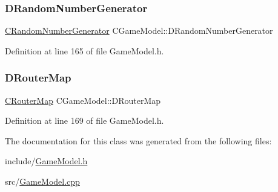 \subsubsection{\texorpdfstring{D\+Random\+Number\+Generator}{DRandomNumberGenerator}}
{\footnotesize\ttfamily \hyperlink{classCRandomNumberGenerator}{C\+Random\+Number\+Generator} C\+Game\+Model\+::\+D\+Random\+Number\+Generator\hspace{0.3cm}{\ttfamily [protected]}}



Definition at line 165 of file Game\+Model.\+h.

\hypertarget{classCGameModel_a37d0b5536c88a3e6ec16f46e7a413adf}{}\label{classCGameModel_a37d0b5536c88a3e6ec16f46e7a413adf} 
\subsubsection{\texorpdfstring{D\+Router\+Map}{DRouterMap}}
{\footnotesize\ttfamily \hyperlink{classCRouterMap}{C\+Router\+Map} C\+Game\+Model\+::\+D\+Router\+Map\hspace{0.3cm}{\ttfamily [protected]}}



Definition at line 169 of file Game\+Model.\+h.



The documentation for this class was generated from the following files\+:\begin{DoxyCompactItemize}
\item 
include/\hyperlink{GameModel_8h}{Game\+Model.\+h}\item 
src/\hyperlink{GameModel_8cpp}{Game\+Model.\+cpp}\end{DoxyCompactItemize}
